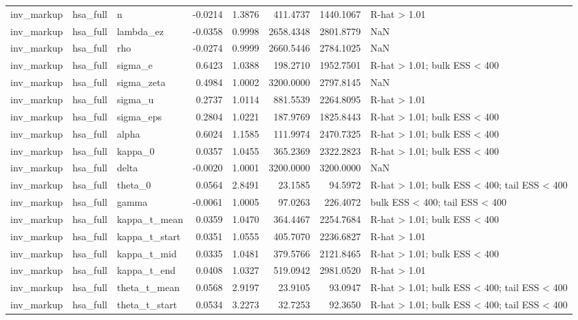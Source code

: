 \begin{tabular}{lllrrrrl}
inv\_markup & hsa\_full & n & -0.0214 & 1.3876 & 411.4737 & 1440.1067 & R-hat > 1.01 \\
inv\_markup & hsa\_full & lambda\_ez & -0.0358 & 0.9998 & 2658.4348 & 2801.8779 & NaN \\
inv\_markup & hsa\_full & rho & -0.0274 & 0.9999 & 2660.5446 & 2784.1025 & NaN \\
inv\_markup & hsa\_full & sigma\_e & 0.6423 & 1.0388 & 198.2710 & 1952.7501 & R-hat > 1.01; bulk ESS < 400 \\
inv\_markup & hsa\_full & sigma\_zeta & 0.4984 & 1.0002 & 3200.0000 & 2797.8145 & NaN \\
inv\_markup & hsa\_full & sigma\_u & 0.2737 & 1.0114 & 881.5539 & 2264.8095 & R-hat > 1.01 \\
inv\_markup & hsa\_full & sigma\_eps & 0.2804 & 1.0221 & 187.9769 & 1825.8443 & R-hat > 1.01; bulk ESS < 400 \\
inv\_markup & hsa\_full & alpha & 0.6024 & 1.1585 & 111.9974 & 2470.7325 & R-hat > 1.01; bulk ESS < 400 \\
inv\_markup & hsa\_full & kappa\_0 & 0.0357 & 1.0455 & 365.2369 & 2322.2823 & R-hat > 1.01; bulk ESS < 400 \\
inv\_markup & hsa\_full & delta & -0.0020 & 1.0001 & 3200.0000 & 3200.0000 & NaN \\
inv\_markup & hsa\_full & theta\_0 & 0.0564 & 2.8491 & 23.1585 & 94.5972 & R-hat > 1.01; bulk ESS < 400; tail ESS < 400 \\
inv\_markup & hsa\_full & gamma & -0.0061 & 1.0005 & 97.0263 & 226.4072 & bulk ESS < 400; tail ESS < 400 \\
inv\_markup & hsa\_full & kappa\_t\_mean & 0.0359 & 1.0470 & 364.4467 & 2254.7684 & R-hat > 1.01; bulk ESS < 400 \\
inv\_markup & hsa\_full & kappa\_t\_start & 0.0351 & 1.0555 & 405.7070 & 2236.6827 & R-hat > 1.01 \\
inv\_markup & hsa\_full & kappa\_t\_mid & 0.0335 & 1.0481 & 379.5766 & 2121.8465 & R-hat > 1.01; bulk ESS < 400 \\
inv\_markup & hsa\_full & kappa\_t\_end & 0.0408 & 1.0327 & 519.0942 & 2981.0520 & R-hat > 1.01 \\
inv\_markup & hsa\_full & theta\_t\_mean & 0.0568 & 2.9197 & 23.9105 & 93.0947 & R-hat > 1.01; bulk ESS < 400; tail ESS < 400 \\
inv\_markup & hsa\_full & theta\_t\_start & 0.0534 & 3.2273 & 32.7253 & 92.3650 & R-hat > 1.01; bulk ESS < 400; tail ESS < 400 \\

\end{tabular}
